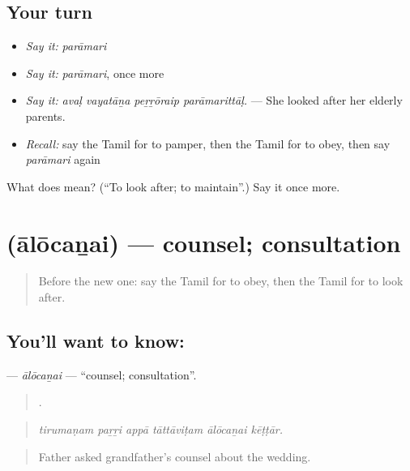 \subsection*{Your turn}
\begin{itemize}
\raggedright
  \item \emph{Say it:} \emph{parāmari}
  \item \emph{Say it:} \emph{parāmari}, once more
  \item \emph{Say it:} \emph{avaḷ vayatāṉa peṟṟōraip parāmarittāḷ.} — She looked after her elderly parents.
  \item \emph{Recall:} say the Tamil for to pamper, then the Tamil for to obey, then say \emph{parāmari} again
\end{itemize}

\begin{tcolorbox}[breakable,colback=teal!4,colframe=teal!35!black,title={Before you move on}]
What does  mean? (\textquotedblleft{}To look after; to maintain\textquotedblright{}.) Say it once more.
\end{tcolorbox}
\section[\texorpdfstring{\ta{ஆலோசனை} (ālōcaṉai)}{ஆலோசனை (ālōcaṉai)}]{ (ālōcaṉai) — counsel; consultation}

\label{lesson:TA-C497-alocanai}



\begin{quote}
Before the new one: say the Tamil for to obey, then the Tamil for to look after.
\end{quote}

\subsection*{You'll want to know: }
\textbf{} — \emph{ālōcaṉai} — \textquotedblleft{}counsel; consultation\textquotedblright{}.

\begin{quote}
     .
\end{quote}

\begin{quote}
\emph{tirumaṇam paṟṟi appā tāttāviṭam ālōcaṉai kēṭṭār.}
\end{quote}

\begin{quote}
Father asked grandfather’s counsel about the wedding.
\end{quote}

